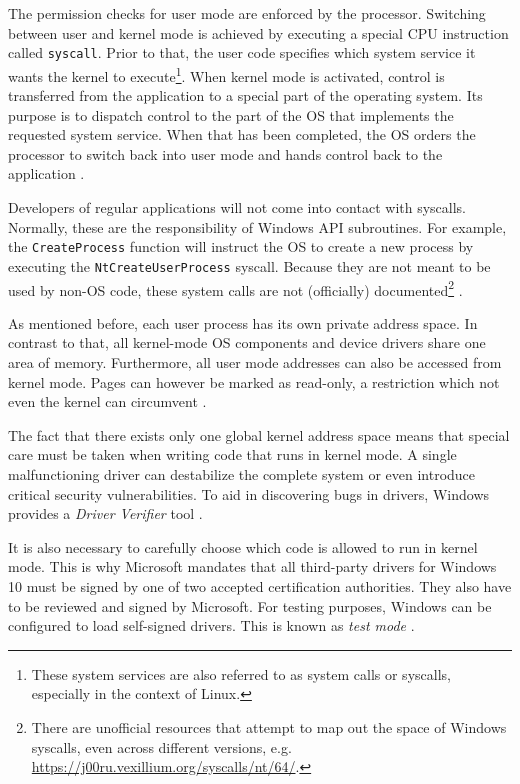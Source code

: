The permission checks for user mode are enforced by the processor. Switching between user and kernel mode is achieved by executing a special CPU instruction called \texttt{syscall}. Prior to that, the user code specifies which system service it wants the kernel to execute\footnote{\label{fn:background.kerneldriver.syscalls} These system services are also referred to as system calls or syscalls, especially in the context of Linux.}. When kernel mode is activated, control is transferred from the application to a special part of the operating system. Its purpose is to dispatch control to the part of the OS that implements the requested system service. When that has been completed, the OS orders the processor to switch back into user mode and hands control back to the application \cite{Yosifovich2017}.

Developers of regular applications will not come into contact with syscalls. Normally, these are the responsibility of Windows API subroutines. For example, the \texttt{CreateProcess} function will instruct the OS to create a new process by executing the \texttt{NtCreateUserProcess} syscall. Because they are not meant to be used by non-OS code, these system calls are not (officially) documented\footnote{\label{fn:background.kerneldriver.syscalldoc} There are unofficial resources that attempt to map out the space of Windows syscalls, even across different versions, e.g. \url{https://j00ru.vexillium.org/syscalls/nt/64/}.} \cite{Yosifovich2017}.

As mentioned before, each user process has its own private address space. In contrast to that, all kernel-mode OS components and device drivers share one area of memory. Furthermore, all user mode addresses can also be accessed from kernel mode. Pages can however be marked as read-only, a restriction which not even the kernel can circumvent \cite{Yosifovich2017}.

The fact that there exists only one global kernel address space means that special care must be taken when writing code that runs in kernel mode. A single malfunctioning driver can destabilize the complete system or even introduce critical security vulnerabilities. To aid in discovering bugs in drivers, Windows provides a \emph{Driver Verifier} tool \cite{Yosifovich2017}.

It is also necessary to carefully choose which code is allowed to run in kernel mode. This is why Microsoft mandates that all third-party drivers for Windows 10 must be signed by one of two accepted certification authorities. They also have to be reviewed and signed by Microsoft. For testing purposes, Windows can be configured to load self-signed drivers. This is known as \emph{test mode} \cite{Yosifovich2017}.

